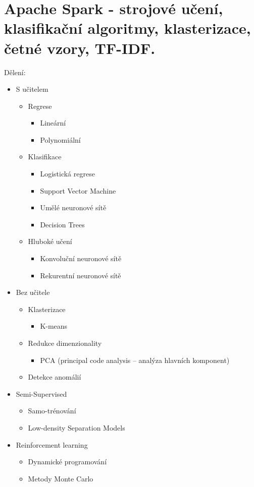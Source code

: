 \section{Apache Spark - strojové učení, klasifikační algoritmy, klasterizace, četné vzory, TF-IDF.}
Dělení:

\begin{itemize}
    \item S učitelem
    \begin{itemize}
        \item Regrese
        \begin{itemize}
            \item Lineární
            \item Polynomiální
        \end{itemize}
        \item Klasifikace
        \begin{itemize}
            \item Logistická regrese
            \item Support Vector Machine
            \item Umělé neuronové sítě
            \item Decision Trees
        \end{itemize}
        \item Hluboké učení
        \begin{itemize}
            \item Konvoluční neuronové sítě
            \item Rekurentní neuronové sítě
        \end{itemize}
    \end{itemize}
    \item Bez učitele
    \begin{itemize}
        \item Klasterizace
        \begin{itemize}
            \item K-means
        \end{itemize}
        \item Redukce dimenzionality
        \begin{itemize}
            \item PCA (principal code analysis -- analýza hlavních komponent)
        \end{itemize}
        \item Detekce anomálií
    \end{itemize}
    \item Semi-Supervised
    \begin{itemize}
        \item Samo-trénování
        \item Low-density Separation Models
    \end{itemize}
    \item Reinforcement learning
    \begin{itemize}
        \item Dynamické programování
        \item Metody Monte Carlo
    \end{itemize}
\end{itemize}

